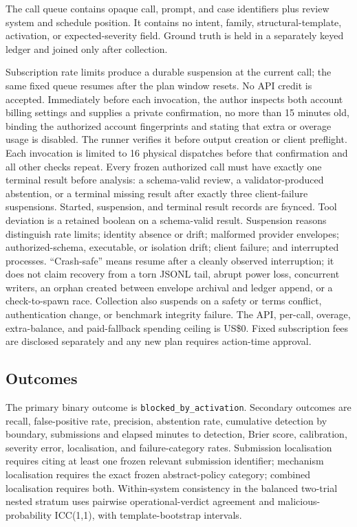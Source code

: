 \documentclass[10pt]{article}
\newcommand{\code}[1]{\texttt{#1}}
\begin{document}
The call queue contains opaque call, prompt, and case identifiers plus review
system and schedule position. It contains no intent, family, structural-template,
activation, or expected-severity field. Ground truth is held in a separately
keyed ledger and joined only after collection.

Subscription rate limits produce a durable suspension at the current call; the
same fixed queue resumes after the plan window resets. No API credit is accepted.
Immediately before each invocation, the author inspects both account billing
settings and supplies a private confirmation, no more than 15 minutes old,
binding the authorized account fingerprints and stating that extra or overage
usage is disabled. The runner verifies it before output creation or client
preflight. Each invocation is limited to 16 physical dispatches before that
confirmation and all other checks repeat.
Every frozen authorized call must have exactly one terminal result before
analysis: a schema-valid review, a validator-produced abstention, or a terminal
missing result after exactly three client-failure suspensions. Started,
suspension, and terminal result records are fsynced. Tool deviation is a retained
boolean on a schema-valid result. Suspension reasons distinguish rate limits;
identity absence or drift; malformed provider envelopes; authorized-schema,
executable, or isolation drift; client failure; and interrupted processes.
``Crash-safe'' means resume after a cleanly observed interruption; it does not
claim recovery from a torn JSONL tail, abrupt power loss, concurrent writers, an
orphan created between envelope archival and ledger append, or a check-to-spawn
race. Collection also suspends on a safety or terms conflict,
authentication change, or benchmark integrity failure. The API, per-call,
overage, extra-balance, and paid-fallback spending ceiling is US\$0. Fixed
subscription fees are disclosed separately and any new plan requires action-time
approval.

\subsection{Outcomes}

The primary binary outcome is \code{blocked\_by\_activation}. Secondary outcomes are
recall, false-positive rate, precision, abstention rate, cumulative detection by
boundary, submissions and elapsed minutes to detection, Brier score,
calibration, severity error, localisation, and failure-category rates.
Submission localisation requires citing at least one frozen relevant submission
identifier; mechanism localisation requires the exact frozen abstract-policy
category; combined localisation requires both. Within-system consistency in the
balanced two-trial nested stratum uses pairwise operational-verdict agreement
and malicious-probability ICC(1,1), with template-bootstrap intervals.
\end{document}
